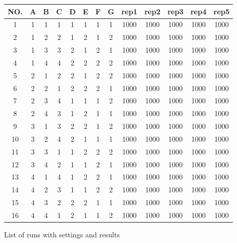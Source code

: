 \begin{figure}[!h]
	\centering
	\begin{tabular}{ |c||c|c|c|c|c|c|c||c|c|c|c|c|  }
		\hline
		NO.& A & B & C & D & E & F & G & rep1 & rep2 & rep3 & rep4 & rep5\\
		\hline
		1  & 1 & 1 & 1 & 1 & 1 & 1 & 1 & 1000 & 1000 & 1000 & 1000 & 1000\\
		2  & 1 & 2 & 2 & 1 & 2 & 1 & 2 & 1000 & 1000 & 1000 & 1000 & 1000\\
		3  & 1 & 3 & 3 & 2 & 1 & 2 & 1 & 1000 & 1000 & 1000 & 1000 & 1000\\
		4  & 1 & 4 & 4 & 2 & 2 & 2 & 2 & 1000 & 1000 & 1000 & 1000 & 1000\\
		5  & 2 & 1 & 2 & 2 & 1 & 2 & 2 & 1000 & 1000 & 1000 & 1000 & 1000\\
		6  & 2 & 2 & 1 & 2 & 2 & 2 & 1 & 1000 & 1000 & 1000 & 1000 & 1000\\
		7  & 2 & 3 & 4 & 1 & 1 & 1 & 2 & 1000 & 1000 & 1000 & 1000 & 1000\\
		8  & 2 & 4 & 3 & 1 & 2 & 1 & 1 & 1000 & 1000 & 1000 & 1000 & 1000\\
		9  & 3 & 1 & 3 & 2 & 2 & 1 & 2 & 1000 & 1000 & 1000 & 1000 & 1000\\
		10 & 3 & 2 & 4 & 2 & 1 & 1 & 1 & 1000 & 1000 & 1000 & 1000 & 1000\\
		11 & 3 & 3 & 1 & 1 & 2 & 2 & 2 & 1000 & 1000 & 1000 & 1000 & 1000\\
		12 & 3 & 4 & 2 & 1 & 1 & 2 & 1 & 1000 & 1000 & 1000 & 1000 & 1000\\
		13 & 4 & 1 & 4 & 1 & 2 & 2 & 1 & 1000 & 1000 & 1000 & 1000 & 1000\\
		14 & 4 & 2 & 3 & 1 & 1 & 2 & 2 & 1000 & 1000 & 1000 & 1000 & 1000\\
		15 & 4 & 3 & 2 & 2 & 2 & 1 & 1 & 1000 & 1000 & 1000 & 1000 & 1000\\
		16 & 4 & 4 & 1 & 2 & 1 & 1 & 2 & 1000 & 1000 & 1000 & 1000 & 1000\\
		\hline
	\end{tabular}
	\caption{List of runs with settings and results}
\end{figure}




